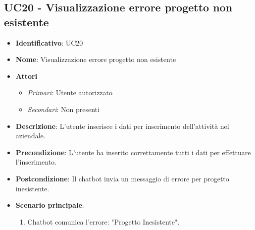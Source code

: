 \subsection{UC20 - Visualizzazione errore progetto non esistente}
\begin{itemize}
	\item \textbf{Identificativo}: UC20
	\item \textbf{Nome}: Visualizzazione errore progetto non esistente
	\item \textbf{Attori}
	\begin{itemize} 
		\item \textit{Primari}: Utente autorizzato
		\item \textit{Secondari}: Non presenti
	\end{itemize}
	\item \textbf{Descrizione}: L'utente inserisce i dati per inserimento dell'attività nel  aziendale.
	\item \textbf{Precondizione}: L'utente ha inserito correttamente tutti i dati per effettuare l'inserimento.
	\item \textbf{Postcondizione}: Il chatbot invia un messaggio di errore per progetto inesistente.
	\item \textbf{Scenario principale}: \begin{enumerate}
		\item Chatbot comunica l'errore: "Progetto Inesistente".
	\end{enumerate}
\end{itemize}